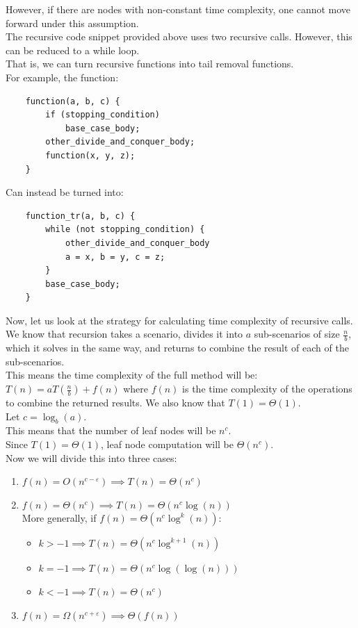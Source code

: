 \documentclass[nobib]{tufte-handout}
\let\epsilon\varepsilon
\begin{document}
However, if there are nodes with non-constant time complexity, one cannot move forward under this assumption.\\
The recursive code snippet provided above uses two recursive calls. However, this can be reduced to a while loop.\\
That is, we can turn recursive functions into tail removal functions.\\For example, the function:
\begin{lstlisting}
    function(a, b, c) {
        if (stopping_condition)
            base_case_body;
        other_divide_and_conquer_body;
        function(x, y, z);
    }
\end{lstlisting}
Can instead be turned into:
\begin{lstlisting}
    function_tr(a, b, c) {
        while (not stopping_condition) {
            other_divide_and_conquer_body
            a = x, b = y, c = z;
        }
        base_case_body;
    }
\end{lstlisting}
Now, let us look at the strategy for calculating time complexity of recursive
calls.\\ We know that recursion takes a scenario, divides it into $a$
sub-scenarios of size $\frac{n}{b}$, which it solves in the same way, and
returns to combine the result of each of the sub-scenarios.\\ This means the
time complexity of the full method will be: $T(n) = aT(\frac{n}{b})+f(n)$ where
$f(n)$ is the time complexity of the operations to combine the returned
results. We also know that $T(1) = \Theta (1)$.\\ Let $c = \log_b(a)$.\\ This
means that the number of leaf nodes will be $n^c$. \\ Since $T(1) = \Theta(1)$,
leaf node computation will be $\Theta(n^c)$.\\ Now we will divide this into
three cases:
\begin{enumerate}
    \item $f(n) = O(n^{c-\epsilon}) \implies T(n) = \Theta(n^c)$
    \item $f(n) = \Theta (n^c) \implies T(n) = \Theta (n^c \log(n))$\\
          More generally, if $f(n) = \Theta (n^c \log^k(n))$:
          \begin{itemize}
              \item $k>-1 \implies T(n) = \Theta (n^c \log^{k+1}(n))$
              \item $k = -1 \implies T(n) = \Theta (n^c \log(\log(n)))$
              \item $k<-1 \implies T(n) = \Theta (n^c)$
          \end{itemize}
    \item $f(n) = \Omega(n^{c+\epsilon}) \implies \Theta (f(n))$
\end{enumerate}
\end{document}

